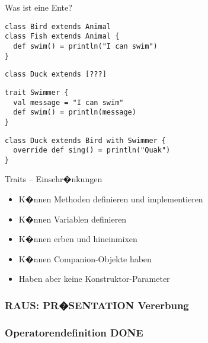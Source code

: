 \documentclass[14pt,aspectratio=169,trans]{beamer} %
\begin{document}
\begin{frame}[fragile]{}
	\begin{block}{Was ist eine Ente?}
		\scriptsize
		\onslide<2->
  \begin{lstlisting}
class Bird extends Animal
class Fish extends Animal {
  def swim() = println("I can swim")
}
	\end{lstlisting}
{
\begin{lstlisting}[firstnumber=4]
class Duck extends [???]
\end{lstlisting}
}
{
\begin{lstlisting}[firstnumber=9]
trait Swimmer {
  val message = "I can swim"
  def swim() = println(message)
}
\end{lstlisting}
}
{
\begin{lstlisting}[firstnumber=9]
class Duck extends Bird with Swimmer {
  override def sing() = println("Quak")
}
\end{lstlisting}
}
	\end{block}
	\note{}
\end{frame}


\begin{frame}{}
	\begin{block}{Traits -- Einschr�nkungen}
		\begin{itemize}
			\item<2->K�nnen Methoden definieren und implementieren
			\item<3->K�nnen Variablen definieren
			\item<4->K�nnen erben und hineinmixen
			\item<5->K�nnen Companion-Objekte haben
			\item<6->Haben aber keine Konstruktor-Parameter
		\end{itemize}
	\end{block}
\end{frame}

\subsubsection*{RAUS: PR�SENTATION Vererbung}

\subsubsection*{Operatorendefinition DONE}
\end{document}
